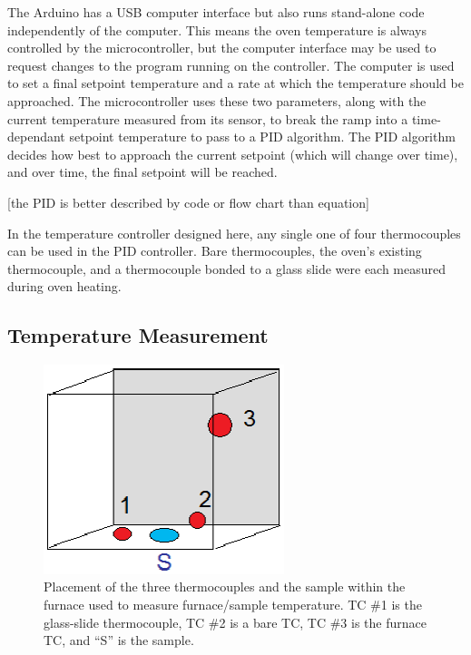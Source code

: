 \documentclass[12pt,oneside,english]{article}
\begin{document}
    The Arduino has a USB computer interface but also runs stand-alone code independently of the computer.
    This means the oven temperature is always controlled by the microcontroller, but the computer interface may be used to request changes to the program running on the controller.
    The computer is used to set a final setpoint temperature and a rate at which the temperature should be approached.  
    The microcontroller uses these two parameters, along with the current temperature measured from its sensor, to break the ramp into a time-dependant setpoint temperature to pass to a PID algorithm.
    The PID algorithm decides how best to approach the current setpoint (which will change over time), and over time, the final setpoint will be reached.

    [the PID is better described by code or flow chart than equation]
    


    In the temperature controller designed here, any single one of four thermocouples can be used in the PID controller.	  
    Bare thermocouples, the oven's existing thermocouple, and a thermocouple bonded to a glass slide were each measured during oven heating.
    
    

    \subsection{Temperature Measurement}
    
    \begin{figure}
    	\includegraphics[width=70mm]{images/oven_tc_placement.eps}
    	\caption{Placement of the three thermocouples and the sample within the furnace used to measure furnace/sample temperature.  TC \#1 is the glass-slide thermocouple, TC \#2 is a bare TC, TC \#3 is the furnace TC, and ``S'' is the sample.}
    	\label{f:furnace_tc}
    \end{figure}
    
\end{document}
